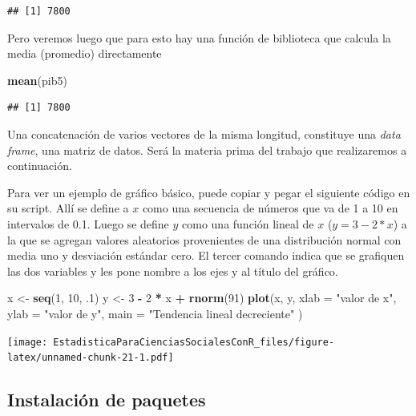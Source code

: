 \documentclass[]{book}
\newenvironment{Shaded}{\begin{snugshade}}{\end{snugshade}}
\newcommand{\DataTypeTok}[1]{\textcolor[rgb]{0.13,0.29,0.53}{#1}}
\newcommand{\DecValTok}[1]{\textcolor[rgb]{0.00,0.00,0.81}{#1}}
\newcommand{\FloatTok}[1]{\textcolor[rgb]{0.00,0.00,0.81}{#1}}
\newcommand{\KeywordTok}[1]{\textcolor[rgb]{0.13,0.29,0.53}{\textbf{#1}}}
\newcommand{\NormalTok}[1]{#1}
\newcommand{\OperatorTok}[1]{\textcolor[rgb]{0.81,0.36,0.00}{\textbf{#1}}}
\newcommand{\StringTok}[1]{\textcolor[rgb]{0.31,0.60,0.02}{#1}}
\begin{document}
\begin{verbatim}
## [1] 7800
\end{verbatim}

Pero veremos luego que para esto hay una función de biblioteca que calcula la media (promedio) directamente

\begin{Shaded}
\begin{Highlighting}[]
\KeywordTok{mean}\NormalTok{(pib5)}
\end{Highlighting}
\end{Shaded}

\begin{verbatim}
## [1] 7800
\end{verbatim}

Una concatenación de varios vectores de la misma longitud, constituye una \emph{data frame}, una matriz de datos. Será la materia prima del trabajo que realizaremos a continuación.

Para ver un ejemplo de gráfico básico, puede copiar y pegar el siguiente código en su script. Allí se define a \(x\) como una secuencia de números que va de 1 a 10 en intervalos de 0.1. Luego se define \(y\) como una función lineal de \(x\) (\(y=3-2*x\)) a la que se agregan valores aleatorios provenientes de una distribución normal con media uno y desviación estándar cero. El tercer comando indica que se grafiquen las dos variables y les pone nombre a los ejes y al título del gráfico.

\begin{Shaded}
\begin{Highlighting}[]
\NormalTok{x <-}\StringTok{ }\KeywordTok{seq}\NormalTok{(}\DecValTok{1}\NormalTok{, }\DecValTok{10}\NormalTok{, }\FloatTok{.1}\NormalTok{)}
\NormalTok{y <-}\StringTok{ }\DecValTok{3} \OperatorTok{-}\StringTok{ }\DecValTok{2} \OperatorTok{*}\StringTok{ }\NormalTok{x }\OperatorTok{+}\StringTok{ }\KeywordTok{rnorm}\NormalTok{(}\DecValTok{91}\NormalTok{)}
\KeywordTok{plot}\NormalTok{(x, y,}
  \DataTypeTok{xlab =} \StringTok{"valor de x"}\NormalTok{, }\DataTypeTok{ylab =} \StringTok{"valor de y"}\NormalTok{,}
  \DataTypeTok{main =} \StringTok{"Tendencia lineal decreciente"}
\NormalTok{)}
\end{Highlighting}
\end{Shaded}

\texttt{[image: EstadisticaParaCienciasSocialesConR\_files/figure-latex/unnamed-chunk-21-1.pdf]}

\hypertarget{instalaciuxf3n-de-paquetes}{%
\subsection{Instalación de paquetes}\label{instalaciuxf3n-de-paquetes}}
\end{document}
